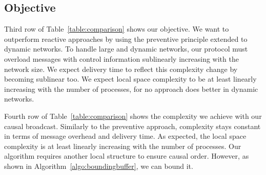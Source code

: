 \subsection{Objective}

Third row of Table~\ref{table:comparison} shows our objective. We want to
outperform reactive approaches by using the preventive principle extended to
dynamic networks. To handle large and dynamic networks, our protocol must
overload messages with control information sublinearly increasing with the
network size. We expect delivery time to reflect this complexity change by
becoming sublinear too. We expect local space complexity to be at least linearly
increasing with the number of processes, for no approach does better in dynamic
networks.

Fourth row of Table~\ref{table:comparison} shows the complexity we achieve with
our causal broadcast. Similarly to the preventive approach, complexity stays
constant in terms of message overhead and delivery time. As expected, the local
space complexity is at least linearly increasing with the number of
processes. Our algorithm requires another local structure to ensure causal
order. However, as shown in Algorithm~\ref{algo:boundingbuffer}, we can bound
it.



